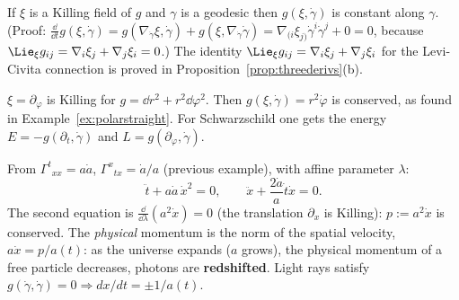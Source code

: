 \begin{formal}
If $\xi$ is a Killing field of $g$ and $\gamma$ is a geodesic then $g(\xi,\dot\gamma)$ is constant along $\gamma$. (Proof: $\frac{\dd}{\dd t}g(\xi,\dot\gamma)=g(\nabla_{\dot\gamma}\xi,\dot\gamma)+g(\xi,\nabla_{\dot\gamma}\dot\gamma)=\nabla_{(i}\xi_{j)}\dot\gamma^i\dot\gamma^j+0=0$, because $\Lie_\xi g_{ij}=\nabla_i\xi_j+\nabla_j\xi_i=0$.)
The identity $\Lie_\xi g_{ij}=\nabla_i\xi_j+\nabla_j\xi_i$ for the Levi-Civita connection is proved in Proposition~\ref{prop:threederivs}(b).
\end{formal}
\begin{example}\label{ex:angmom}
$\xi=\partial_\varphi$ is Killing for $g=\dd r^2+r^2\dd\varphi^2$. Then $g(\xi,\dot\gamma)=r^2\dot\varphi$ is conserved, as found in Example~\ref{ex:polarstraight}. For Schwarzschild one gets the energy $E=-g(\partial_t,\dot\gamma)$ and $L=g(\partial_\varphi,\dot\gamma)$.
\end{example}

\begin{example}
From $\Gamma^t{}_{xx}=a\dot a$, $\Gamma^x{}_{tx}=\dot a/a$ (previous example), with affine parameter $\lambda$:
\[
\ddot t+a\dot a\,\dot x^2=0,\qquad\ddot x+\frac{2\dot a}{a}\dot t\dot x=0 .
\]
The second equation is $\frac{\dd}{\dd\lambda}(a^2\dot x)=0$ (the translation $\partial_x$ is Killing): $p:=a^2\dot x$ is conserved. The \emph{physical} momentum is the norm of the spatial velocity, $a\dot x=p/a(t)$: as the universe expands ($a$ grows), the physical momentum of a free particle decreases, \ie photons are \textbf{redshifted}. Light rays satisfy $g(\dot\gamma,\dot\gamma)=0\Rightarrow dx/dt=\pm1/a(t)$.
\end{example}
